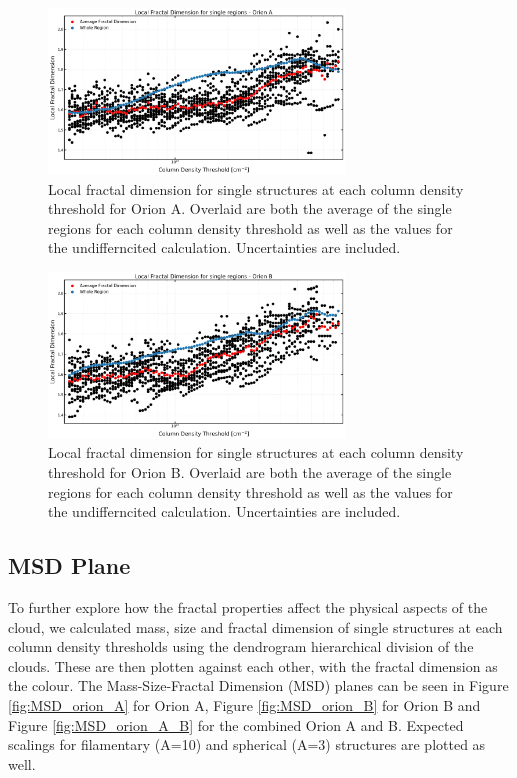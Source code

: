 \begin{figure}[t]
    \centering
    \includegraphics[width=0.7\textwidth]{figures/local_Orion_A_single_structures.png}
    \caption{Local fractal dimension for single structures at each column density threshold for Orion A. Overlaid are both the average of the single regions for each column density threshold as well as the values for the undifferncited calculation. Uncertainties are included.}
    \label{fig:local_A_single_structures}
\end{figure}

\begin{figure}[t]
    \centering
    \includegraphics[width=0.7\textwidth]{figures/local_Orion_B_single_structures.png}
    \caption{Local fractal dimension for single structures at each column density threshold for Orion B. Overlaid are both the average of the single regions for each column density threshold as well as the values for the undifferncited calculation. Uncertainties are included.}
    \label{fig:local_B_single_structures}
\end{figure}

\subsection{MSD Plane}

To further explore how the fractal properties affect the physical aspects of the cloud, we calculated mass, size and fractal dimension of single structures at each column density thresholds using the dendrogram hierarchical division of the clouds.
These are then plotten against each other, with the fractal dimension as the colour. 
The Mass-Size-Fractal Dimension (MSD) planes can be seen in Figure \ref{fig:MSD_orion_A} for Orion A, Figure \ref{fig:MSD_orion_B} for Orion B and Figure \ref{fig:MSD_orion_A_B} for the combined Orion A and B. 
Expected scalings for filamentary (A=10) and spherical (A=3) structures are plotted as well.

